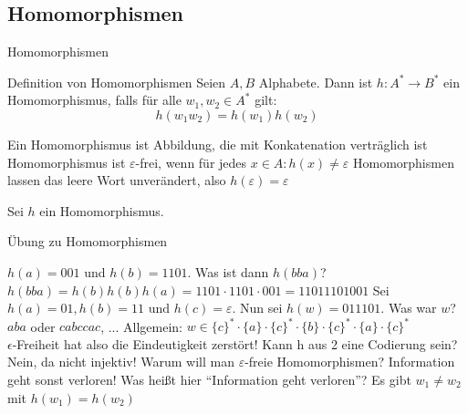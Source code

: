 \documentclass[handout]{beamer}
\begin{document}
\subsection{Homomorphismen}

\begin{frame}{Homomorphismen}
\begin{block} {Definition von Homomorphismen}\p
Seien $A, B$ Alphabete. \p Dann ist $h: A^* \rightarrow B^*$ \p ein Homomorphismus\p , falls für alle $w_1, w_2 \in A^*$ gilt:\\ \p
\begin{equation*}
h(w_1w_2) = h(w_1)h(w_2)
\end{equation*}
\end{block}

\begin{itemize}
\pitem Ein Homomorphismus ist Abbildung, die mit Konkatenation verträglich ist
\pitem Homomorphismus ist $\varepsilon$-frei, wenn für jedes $x \in A: h(x) \neq \varepsilon$
\pitem Homomorphismen lassen das leere Wort unverändert, also $h(\varepsilon) = \varepsilon$
\end{itemize}
\end{frame}

\begin{frame}
Sei $h$ ein Homomorphismus.

\begin{taskblock}{Übung zu Homomorphismen}
\begin{enumerate}
\pitem $h(a) = 001$ und $h(b) = 1101$. Was ist dann $h(bba)$? 
\pitem[$\rightarrow$] $h(bba) = h(b)h(b)h(a) = 1101 \cdot 1101 \cdot 001 = 11011101001$
\pitem Sei $h(a) = 01, h(b) = 11 \text{ und } h(c) = \varepsilon$. Nun sei $h(w)= 011101$. Was war $w$? 
\pitem[$\rightarrow$] $aba$ oder $cabccac$, ... Allgemein: $w \in \{c\}^* \cdot \{a\} \cdot \{c\}^* \cdot \{b\} \cdot \{c\}^* \cdot \{a\} \cdot \{c\}^*$ \\ \p $\epsilon$-Freiheit hat also die Eindeutigkeit zerstört!
\pitem Kann h aus 2 eine Codierung sein?
\pitem[$\rightarrow$] Nein, da nicht injektiv!
\pitem Warum will man $\varepsilon$-freie Homomorphismen?
\pitem[$\rightarrow$] Information geht sonst verloren!
\pitem Was heißt hier ``Information geht verloren''? 
\pitem[$\rightarrow$] Es gibt $w_1 \neq w_2$ mit $h(w_1) = h(w_2)$
\end{enumerate}
\end{taskblock}
\end{frame}
\end{document}
